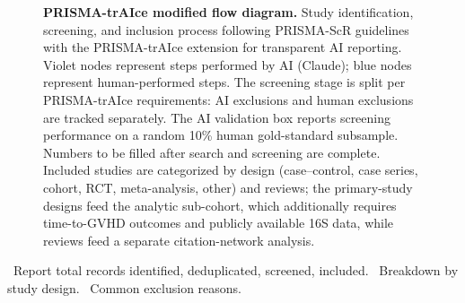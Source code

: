 \documentclass[11pt,a4paper]{article}
\newcommand{\todoitem}[1]{\textcolor{blue!70!black}{\textbullet~#1}}
\begin{document}
\begin{figure}[htbp]
{\begin{tikzpicture}
\end{tikzpicture}
}%
\caption{\textbf{PRISMA-trAIce modified flow diagram.}
Study identification, screening, and inclusion process following PRISMA-ScR guidelines with the PRISMA-trAIce extension for transparent AI reporting.
Violet nodes represent steps performed by AI (Claude); blue nodes represent human-performed steps.
The screening stage is split per PRISMA-trAIce requirements: AI exclusions and human exclusions are tracked separately.
The AI validation box reports screening performance on a random 10\% human gold-standard subsample.
Numbers to be filled after search and screening are complete.
Included studies are categorized by design (case--control, case series, cohort, RCT, meta-analysis, other) and reviews; the primary-study designs feed the analytic sub-cohort, which additionally requires time-to-GVHD outcomes and publicly available 16S data, while reviews feed a separate citation-network analysis.}
\label{fig:prisma}
\end{figure}


\todoitem{Report total records identified, deduplicated, screened, included.}
\todoitem{Breakdown by study design.}
\todoitem{Common exclusion reasons.}
\end{document}
